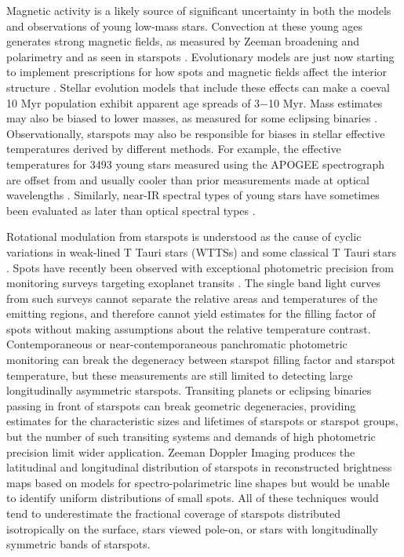 \documentclass[twocolumn]{emulateapj}%
\begin{document}
Magnetic activity is a likely source of significant uncertainty in both the models and observations of young low-mass stars. Convection at these young ages generates strong magnetic fields, as measured by Zeeman broadening and polarimetry \citep[e.g.][]{johnskrull07,donati09} and as seen in starspots \citep[e.g.][]{stauffer03,grankin08}.  Evolutionary models are just now starting to implement prescriptions for how spots and magnetic fields affect the interior structure \citep{macdonald13,jackson14a,somers15,feiden16}.  Stellar evolution models that include these effects can make a coeval 10 Myr population exhibit apparent age spreads of 3$-$10 Myr.  Mass estimates may also be biased to lower masses, as measured for some eclipsing binaries \citep[e.g.][]{stassun14,rizzuto16}.   Observationally, starspots may also be responsible for biases in stellar effective temperatures derived by different methods.  For example, the effective temperatures for 3493 young stars measured using the APOGEE spectrograph \citep[$1.5-1.70 \;\mu$m at $R=22,500$][]{wilson10} are offset from and usually cooler than prior measurements made at optical wavelengths \citep{cottaar14}.  Similarly, near-IR spectral types of young stars have sometimes been evaluated as later than optical spectral types \citep{bouvier92,vacca11}.


Rotational modulation from starspots is understood as the cause of cyclic variations in weak-lined T Tauri stars (WTTSs) and some classical T Tauri stars \citep[e.g.][]{vrba86,herbst94}.  Spots have recently been observed with exceptional photometric precision from monitoring surveys targeting exoplanet transits \citep[\emph{e.g}][]{harrison11,davenport15}.  The single band light curves from such surveys cannot separate the relative areas and temperatures of the emitting regions, and therefore cannot yield estimates for the filling factor of spots without making assumptions about the relative temperature contrast. Contemporaneous or near-contemporaneous panchromatic photometric monitoring \citep{herbst94,petrov94,bouvier95,grankin07,cody14} can break the degeneracy between starspot filling factor and starspot temperature, but these measurements are still limited to detecting large longitudinally asymmetric starspots.  Transiting planets or eclipsing binaries passing in front of starspots \citep{desert11} can break geometric degeneracies, providing estimates for the characteristic sizes and lifetimes of starspots or starspot groups, but the number of such transiting systems and demands of high photometric precision limit wider application.  Zeeman Doppler Imaging \citep[ZDI]{donati14} produces the latitudinal and longitudinal distribution of starspots in reconstructed brightness maps based on models for spectro-polarimetric line shapes but would be unable to identify uniform distributions of small spots.  All of these techniques would tend to underestimate the fractional coverage of starspots distributed isotropically on the surface, stars viewed pole-on, or stars with longitudinally symmetric bands of starspots.
\end{document}
